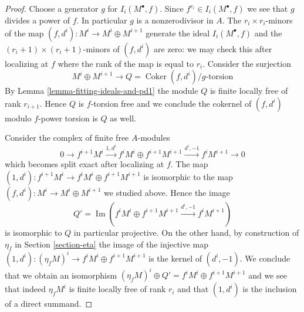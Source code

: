 \documentclass[10pt,a4paper]{amsart}
\theoremstyle{plain}
\theoremstyle{definition}
\theoremstyle{remark}
\numberwithin{equation}{subsection}
\def\Im{\mathop{\mathrm{Im}}}
\def\Coker{\mathop{\mathrm{Coker}}}
\begin{document}
\begin{proof}
Choose a generator $g$ for $I_i(M^\bullet, f)$. Since
$f^{r_i} \in I_i(M^\bullet, f)$ we see that $g$ divides a power of $f$.
In particular $g$ is a nonzerodivisor in $A$.
The $r_i \times r_i$-minors of the map
$(f, d^i) : M^i \to M^i \oplus M^{i + 1}$
generate the ideal $I_i(M^\bullet, f)$ and the
$(r_i + 1) \times (r_i + 1)$-minors of $(f, d^i)$ are zero:
we may check this after localizing at $f$
where the rank of the map is equal to $r_i$.
Consider the surjection
$$
M^i \oplus M^{i + 1}
\longrightarrow
Q = \Coker(f, d^i)/g\text{-torsion}
$$
By Lemma \ref{lemma-fitting-ideals-and-pd1}
the module $Q$ is finite locally free of rank $r_{i + 1}$.
Hence $Q$ is $f$-torsion free and we conclude the cokernel of
$(f, d^i)$ modulo $f$-power torsion is $Q$ as well.

\medskip\noindent
Consider the complex of finite free $A$-modules
$$
0 \to f^{i + 1}M^i \xrightarrow{1, d^i} f^iM^i \oplus f^{i + 1}M^{i + 1}
\xrightarrow{d^i, -1} f^iM^{i + 1} \to 0
$$
which becomes split exact after localizing at $f$.
The map $(1, d^i) : f^{i + 1}M^i \to f^iM^i \oplus f^{i + 1}M^{i + 1}$
is isomorphic to the map $(f, d^i) : M^i \to M^i \oplus M^{i + 1}$ we
studied above. Hence the image
$$
Q' = \Im(f^iM^i \oplus f^{i + 1}M^{i + 1} \xrightarrow{d^i, -1} f^iM^{i + 1})
$$
is isomorphic to $Q$ in particular projective. On the other hand,
by construction of $\eta_f$ in Section \ref{section-eta}
the image of the injective map
$(1, d^i) : (\eta_fM)^i \to f^iM^i \oplus f^{i + 1}M^{i + 1}$ is
the kernel of $(d^i, -1)$. We conclude that we obtain an
isomorphism $(\eta_fM)^i \oplus Q' = f^iM^i \oplus f^{i + 1}M^{i + 1}$
and we see that indeed $\eta_fM^i$ is finite locally free
of rank $r_i$ and that $(1, d^i)$ is the inclusion of a direct
summand.
\end{proof}
\end{document}
